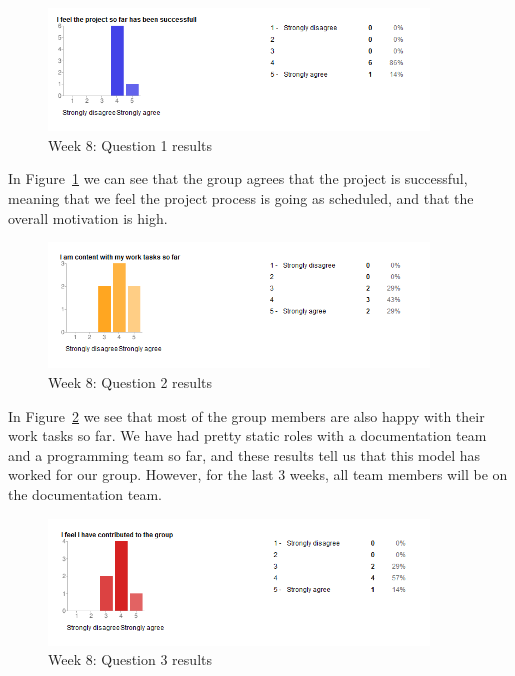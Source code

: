 \begin{figure}[th!]
\centering
\includegraphics[width=0.9\textwidth]{evaluation/week_8_images/project_successfull}
\caption{Week 8: Question 1 results}
\label{fig:W8Q1}
\end{figure}

In Figure~\ref{fig:W8Q1} we can see that the group agrees that the project is successful, meaning that we feel the project process is going as scheduled, and that the overall motivation is high. 

\begin{figure}[th!]
\centering
\includegraphics[width=0.9\textwidth]{evaluation/week_8_images/work_tasks}
\caption{Week 8: Question 2 results}
\label{fig:W8Q2}
\end{figure}

In Figure~\ref{fig:W8Q2} we see that most of the group members are also happy with their work tasks so far. We have had pretty static roles with a documentation team and a programming team so far, and these results tell us that this model has worked for our group. However, for the last 3 weeks, all team members will be on the documentation team.

\begin{figure}[th!]
\centering
\includegraphics[width=0.9\textwidth]{evaluation/week_8_images/contributed_group}
\caption{Week 8: Question 3 results}
\label{fig:W8Q3}
\end{figure}

